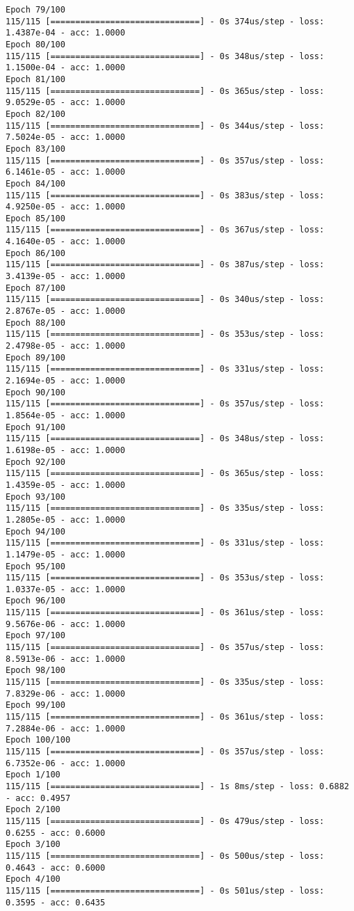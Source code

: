 \documentclass[11pt]{article}
\begin{document}
\begin{Verbatim}[commandchars=\\\{\}]
Epoch 79/100
115/115 [==============================] - 0s 374us/step - loss: 1.4387e-04 - acc: 1.0000
Epoch 80/100
115/115 [==============================] - 0s 348us/step - loss: 1.1500e-04 - acc: 1.0000
Epoch 81/100
115/115 [==============================] - 0s 365us/step - loss: 9.0529e-05 - acc: 1.0000
Epoch 82/100
115/115 [==============================] - 0s 344us/step - loss: 7.5024e-05 - acc: 1.0000
Epoch 83/100
115/115 [==============================] - 0s 357us/step - loss: 6.1461e-05 - acc: 1.0000
Epoch 84/100
115/115 [==============================] - 0s 383us/step - loss: 4.9250e-05 - acc: 1.0000
Epoch 85/100
115/115 [==============================] - 0s 367us/step - loss: 4.1640e-05 - acc: 1.0000
Epoch 86/100
115/115 [==============================] - 0s 387us/step - loss: 3.4139e-05 - acc: 1.0000
Epoch 87/100
115/115 [==============================] - 0s 340us/step - loss: 2.8767e-05 - acc: 1.0000
Epoch 88/100
115/115 [==============================] - 0s 353us/step - loss: 2.4798e-05 - acc: 1.0000
Epoch 89/100
115/115 [==============================] - 0s 331us/step - loss: 2.1694e-05 - acc: 1.0000
Epoch 90/100
115/115 [==============================] - 0s 357us/step - loss: 1.8564e-05 - acc: 1.0000
Epoch 91/100
115/115 [==============================] - 0s 348us/step - loss: 1.6198e-05 - acc: 1.0000
Epoch 92/100
115/115 [==============================] - 0s 365us/step - loss: 1.4359e-05 - acc: 1.0000
Epoch 93/100
115/115 [==============================] - 0s 335us/step - loss: 1.2805e-05 - acc: 1.0000
Epoch 94/100
115/115 [==============================] - 0s 331us/step - loss: 1.1479e-05 - acc: 1.0000
Epoch 95/100
115/115 [==============================] - 0s 353us/step - loss: 1.0337e-05 - acc: 1.0000
Epoch 96/100
115/115 [==============================] - 0s 361us/step - loss: 9.5676e-06 - acc: 1.0000
Epoch 97/100
115/115 [==============================] - 0s 357us/step - loss: 8.5913e-06 - acc: 1.0000
Epoch 98/100
115/115 [==============================] - 0s 335us/step - loss: 7.8329e-06 - acc: 1.0000
Epoch 99/100
115/115 [==============================] - 0s 361us/step - loss: 7.2884e-06 - acc: 1.0000
Epoch 100/100
115/115 [==============================] - 0s 357us/step - loss: 6.7352e-06 - acc: 1.0000
Epoch 1/100
115/115 [==============================] - 1s 8ms/step - loss: 0.6882 - acc: 0.4957
Epoch 2/100
115/115 [==============================] - 0s 479us/step - loss: 0.6255 - acc: 0.6000
Epoch 3/100
115/115 [==============================] - 0s 500us/step - loss: 0.4643 - acc: 0.6000
Epoch 4/100
115/115 [==============================] - 0s 501us/step - loss: 0.3595 - acc: 0.6435

\end{Verbatim}
\end{document}
